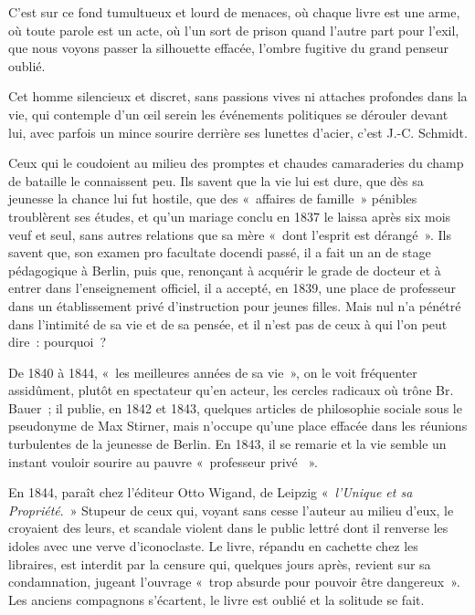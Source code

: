 \documentclass[french,twoside]{book} %
\begin{document}
C’est sur ce fond tumultueux et lourd de menaces, où chaque livre est une arme, où toute parole est un acte, où l’un sort de prison quand l’autre part pour l’exil, que nous voyons passer la silhouette effacée, l’ombre fugitive du grand penseur oublié.\par
Cet homme silencieux et discret, sans passions vives ni attaches profondes dans la vie, qui contemple d’un œil serein les événements politiques se dérouler devant lui, avec parfois un mince sourire derrière ses lunettes d’acier, c’est J.-C. Schmidt.\par
Ceux qui le coudoient au milieu des promptes et chaudes camaraderies du champ de bataille le connaissent peu. Ils savent que la vie lui est dure, que dès sa jeunesse la chance lui fut hostile, que des « affaires de famille » pénibles troublèrent ses études, et qu’un mariage conclu en 1837 le laissa après six mois veuf et seul, sans autres relations que sa mère « dont l’esprit est dérangé ». Ils savent que, son examen pro facultate docendi passé, il a fait un an de stage pédagogique à Berlin, puis que, renonçant à acquérir le grade de docteur et à entrer dans l’enseignement officiel, il a accepté, en 1839, une  place de professeur dans un établissement privé d’instruction pour jeunes filles. Mais nul n’a pénétré dans l’intimité de sa vie et de sa pensée, et il n’est pas de ceux à qui l’on peut dire : pourquoi ?\par
De 1840 à 1844, « les meilleures années de sa vie », on le voit fréquenter assidûment, plutôt en spectateur qu’en acteur, les cercles radicaux où trône Br. Bauer ; il publie, en 1842 et 1843, quelques articles de philosophie sociale sous le pseudonyme de Max Stirner, mais n’occupe qu’une place effacée dans les réunions turbulentes de la jeunesse de Berlin. En 1843, il se remarie et la vie semble un instant vouloir sourire au pauvre « professeur privé  ».\par
En 1844, paraît chez l’éditeur Otto Wigand, de Leipzig « \emph{l’Unique et sa Propriété}. » Stupeur de ceux qui, voyant sans cesse l’auteur au milieu d’eux, le croyaient des leurs, et scandale violent dans le public lettré dont il renverse les idoles avec une verve d’iconoclaste. Le livre, répandu en cachette chez les libraires, est interdit par la censure qui, quelques jours après, revient sur sa condamnation, jugeant l’ouvrage « trop absurde pour pouvoir être dangereux ». Les anciens compagnons s’écartent, le livre est oublié et la solitude se fait.\par
\end{document}
